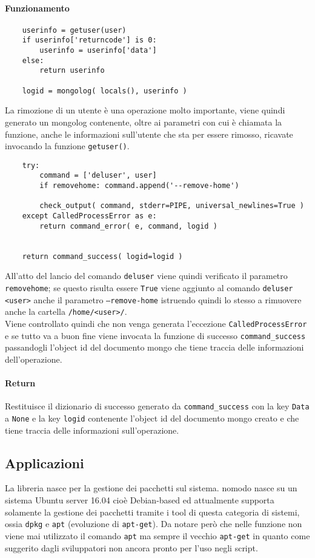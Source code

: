 \documentclass[11pt]{article}
\begin{document}
\paragraph{Funzionamento}
\begin{lstlisting}
    userinfo = getuser(user)
    if userinfo['returncode'] is 0:
        userinfo = userinfo['data']
    else:
        return userinfo

    logid = mongolog( locals(), userinfo )
\end{lstlisting}
La rimozione di un utente è una operazione molto importante, viene quindi generato un mongolog contenente,
oltre ai parametri con cui è chiamata la funzione, anche le informazioni sull'utente che sta per essere rimosso,
ricavate invocando la funzione \texttt{getuser()}.
\begin{lstlisting}
    try:
        command = ['deluser', user]
        if removehome: command.append('--remove-home') 

        check_output( command, stderr=PIPE, universal_newlines=True )
    except CalledProcessError as e:
        return command_error( e, command, logid )
    
    
    return command_success( logid=logid )
\end{lstlisting}
All'atto del lancio del comando \texttt{deluser} viene quindi verificato il parametro \texttt{removehome};
se questo risulta essere \texttt{True} viene aggiunto al comando \texttt{deluser <user>} anche il parametro
\texttt{--remove-home} istruendo quindi lo stesso a rimuovere anche la cartella \texttt{/home/<user>/}.\\
Viene controllato quindi che non venga generata l'eccezione \texttt{CalledProcessError} e se tutto va a buon fine
viene invocata la funzione di successo \texttt{command\_success} passandogli l'object id del documento mongo
che tiene traccia delle informazioni dell'operazione.
\paragraph{Return}
Restituisce il dizionario di successo generato da \texttt{command\_success} con la key \texttt{Data} a \texttt{None}
e la key \texttt{logid} contenente l'object id del documento mongo creato e che tiene traccia delle informazioni
sull'operazione.

\subsection{Applicazioni}\label{apps}
La libreria nasce per la gestione dei pacchetti sul sistema. nomodo nasce su un sistema Ubuntu server 16.04 cioè
Debian-based ed attualmente supporta solamente la gestione dei pacchetti tramite i tool di questa categoria di sistemi,
ossia \texttt{dpkg} e \texttt{apt} (evoluzione di \texttt{apt-get}). Da notare però che nelle funzione non viene
mai utilizzato il comando \texttt{apt} ma sempre il vecchio \texttt{apt-get} in quanto come suggerito dagli
sviluppatori non ancora pronto per l'uso negli script.
\end{document}
